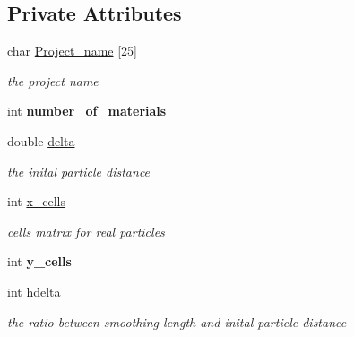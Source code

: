 \subsection*{Private Attributes}
\begin{CompactItemize}
\item 
\hypertarget{classOutput_b52dd1cb165a9270cc45610b0bc8cc43}{
char \hyperlink{classOutput_b52dd1cb165a9270cc45610b0bc8cc43}{Project\_\-name} \mbox{[}25\mbox{]}}
\label{classOutput_b52dd1cb165a9270cc45610b0bc8cc43}

\begin{CompactList}\small\item\em the project name \item\end{CompactList}\item 
\hypertarget{classOutput_c2696f9c30e4840eab5b7ab3901bbf6b}{
int \textbf{number\_\-of\_\-materials}}
\label{classOutput_c2696f9c30e4840eab5b7ab3901bbf6b}

\item 
\hypertarget{classOutput_b3283271fd00c93268f9af19879a2fc6}{
double \hyperlink{classOutput_b3283271fd00c93268f9af19879a2fc6}{delta}}
\label{classOutput_b3283271fd00c93268f9af19879a2fc6}

\begin{CompactList}\small\item\em the inital particle distance \item\end{CompactList}\item 
\hypertarget{classOutput_8222be56a91be9ffd805ae2f87d68ec5}{
int \hyperlink{classOutput_8222be56a91be9ffd805ae2f87d68ec5}{x\_\-cells}}
\label{classOutput_8222be56a91be9ffd805ae2f87d68ec5}

\begin{CompactList}\small\item\em cells matrix for real particles \item\end{CompactList}\item 
\hypertarget{classOutput_d9bb2a18d020f12343b75eb5844fa79b}{
int \textbf{y\_\-cells}}
\label{classOutput_d9bb2a18d020f12343b75eb5844fa79b}

\item 
\hypertarget{classOutput_b2ba6673b6ca7b7ad7d952015c6dbfb7}{
int \hyperlink{classOutput_b2ba6673b6ca7b7ad7d952015c6dbfb7}{hdelta}}
\label{classOutput_b2ba6673b6ca7b7ad7d952015c6dbfb7}

\begin{CompactList}\small\item\em the ratio between smoothing length and inital particle distance \item\end{CompactList}\end{CompactItemize}


